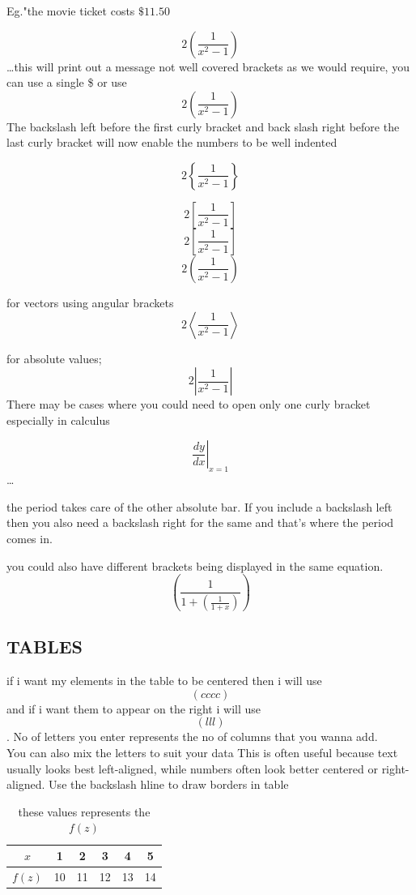 \documentclass[a4paper,12pt]{article}
\begin{document}
  		Eg."the movie ticket costs $\$11.50$
  		
  		$$2(\frac{1}{x^2-1})$$ \ldots this will print out a message not well covered brackets as we would require, you can use a single \$ or use $$2\left(\frac{1}{x^2-1}\right)$$ 	The backslash left before the first curly bracket and back slash right before the last curly bracket will now enable the numbers to be well indented
  		
  		$$2\left\{\frac{1}{x^2-1}\right\}$$
  		
  		$$2\left[\frac{1}{x^2-1}\right]$$
  		$$2\left[\frac{1}{x^2-1}\right]$$
  		$$2\left(   \frac{1}{x^2-1}       \right)      $$
  		
  		for vectors using angular brackets
  		$$2\left \langle \frac{1}{x^2-1}\right \rangle$$
  		
  		for absolute values;
  		$$2\left |\frac{1}{x^2-1}\right| $$
  		There may be cases where you could need to open only one curly bracket especially in calculus
  		
  		$$\left.\frac{dy}{dx}\right |_{x=1}$$ \ldots
  		
  		 the period takes care of the other absolute bar. If you include a backslash left then you also need a backslash right for the same and that's where the period comes in.
  		
  		 you could also have different brackets being displayed in the same equation.
  		 $$\left(\frac{1}{1+\left(\frac{1}{1+x}\right)}\right)$$
  		 
  		 
  		 
  		 
  		 
  		 
  		 \subsection{TABLES}
  		 if i want my elements in the table to be centered then i will use $$\left(cccc\right)$$ and if i want them to appear on the right i will use $$\left(lll\right)$$. No of letters you enter represents the no of columns that you wanna add.\\
  		 
  		 You can also mix the letters to suit your data
  		 This is often useful because text usually looks best left-aligned, while numbers often look better centered or right-aligned.
  		 Use the backslash hline to draw borders in table\\[2pt]
  		 
  		\begin{table}[ht]
  			\centering
  			\caption{these values represents the $f(z)$}
  	\def\arraystretch{1.5}
  		 \begin{tabular}{|c||c|c|c|c|c|}
  		 \hline
  		 \(x\) & 1 	& 2 & 3 & 4 & 5\\ \hline
  		 $f(z)$ & 10 & 11 & 12 & 13 & 14\\ \hline
  		 \end{tabular}
  		 \end{table}
  		 
\end{document}
